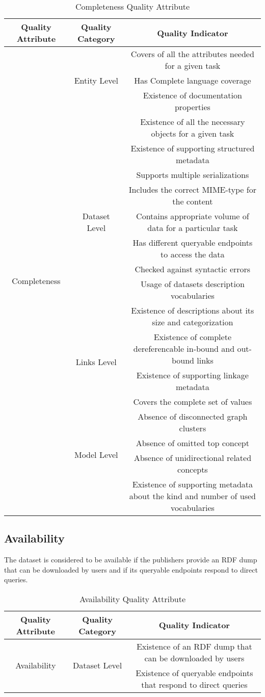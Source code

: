 \documentclass[onecolumn, crcready]{iosart2c}
\begin{document}
\begin{table}[h]
\centering
\begin{tabular}{|c|c|c|}
\hline 
Quality Attribute & Quality Category & Quality Indicator\tabularnewline
\hline 
\hline 
\multirow{19}{*}{Completeness} & \multirow{3}{*}{Entity Level} & Covers of all the attributes needed for a given task\tabularnewline
\cline{3-3} 
 &  & Has Complete language coverage \tabularnewline
\cline{3-3} 
 &  & Existence of documentation properties \tabularnewline
\cline{2-3} 
 & \multirow{9}{*}{Dataset Level} & Existence of all the necessary objects for a given task \tabularnewline
\cline{3-3} 
 &  & Existence of supporting structured metadata \tabularnewline
\cline{3-3} 
 &  & Supports multiple serializations\tabularnewline
\cline{3-3} 
 &  & Includes the correct MIME-type for the content\tabularnewline
\cline{3-3} 
 &  & Contains appropriate volume of data for a particular task\tabularnewline
\cline{3-3} 
 &  & Has different queryable endpoints to access the data\tabularnewline
\cline{3-3} 
 &  & Checked against syntactic errors\tabularnewline
\cline{3-3} 
 &  & Usage of datasets description vocabularies \tabularnewline
\cline{3-3} 
 &  & Existence of descriptions about its size and categorization \tabularnewline
\cline{2-3} 
 & \multirow{2}{*}{Links Level} & Existence of complete dereferencable in-bound and out-bound links\tabularnewline
\cline{3-3} 
 &  & Existence of supporting linkage metadata\tabularnewline
\cline{2-3} 
 & \multirow{5}{*}{Model Level} & Covers the complete set of values\tabularnewline
\cline{3-3} 
 &  & Absence of disconnected graph clusters\tabularnewline
\cline{3-3} 
 &  & Absence of omitted top concept\tabularnewline
\cline{3-3} 
 &  & Absence of unidirectional related concepts\tabularnewline
\cline{3-3} 
 &  & Existence of supporting metadata about the kind and number of used vocabularies \tabularnewline
\hline 
\end{tabular}\caption{Completeness Quality Attribute}
\end{table}

\subsection{Availability}

The dataset is considered to be available if the publishers provide an RDF dump that can be downloaded by users \cite{flemming2010}\cite{Hogan2010} and if its queryable endpoints respond to direct queries.


\begin{table}[h]
\begin{tabular}{|c|c|c|}
\hline 
Quality Attribute & Quality Category & Quality Indicator\tabularnewline
\hline 
\hline 
\multirow{2}{*}{Availability} & \multirow{2}{*}{Dataset Level} & Existence of an RDF dump that can be downloaded by users\tabularnewline
\cline{3-3} 
 &  & Existence of queryable endpoints that respond to direct queries\tabularnewline
\hline 
\end{tabular}\caption{Availability Quality Attribute}
\end{table}
\end{document}
